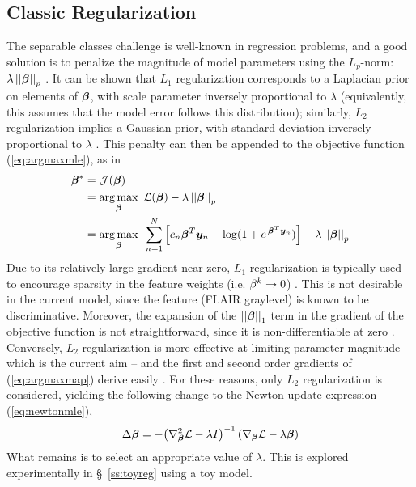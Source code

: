 \subsection{Classic Regularization}
The separable classes challenge is well-known in regression problems, and a good solution is to penalize the magnitude of model parameters using the $L_p$-norm: $\lambda\left|\left|\bm{\beta}\right|\right|_p$ \cite{Zou2005}. It can be shown that $L_1$ regularization corresponds to a Laplacian prior on elements of $\bm{\beta}$, with scale parameter inversely proportional to $\lambda$ (equivalently, this assumes that the model error follows this distribution); similarly, $L_2$ regularization implies a Gaussian prior, with standard deviation inversely proportional to $\lambda$ \cite{Zou2005}. This penalty can then be appended to the objective function (\ref{eq:argmaxmle}), as in 
\begin{align}
\bm{\beta}^* &= \mathcal{J}(\bm{\beta})\nonumber\\
&= \underset{\bm{\beta}}{\arg\max}\enspace\mathcal{L}(\bm{\beta}) - \lambda\left|\left|\bm{\beta}\right|\right|_p \nonumber\\
&= \underset{\bm{\beta}}{\arg\max}\enspace\sum_{n=1}^{N} \Big[ c_n \bm{\beta}^T\bm{y}_n - \log (1+e^{\thinspace\bm{\beta}^T\bm{y}_n}) \Big] - \lambda\left|\left|\bm{\beta}\right|\right|_p
\label{eq:argmaxmap}
\end{align}
Due to its relatively large gradient near zero, $L_1$ regularization is typically used to encourage sparsity in the feature weights (i.e. $\beta^k\rightarrow0$) \cite{Tibshirani1996}. This is not desirable in the current model, since the feature (FLAIR graylevel) is known to be discriminative. Moreover, the expansion of the $\left|\left|\bm{\beta}\right|\right|_1$ term in the gradient of the objective function is not straightforward, since it is non-differentiable at zero \cite{Tibshirani1996,Lee2006}. Conversely, $L_2$ regularization is more effective at limiting parameter magnitude -- which is the current aim -- and the first and second order gradients of (\ref{eq:argmaxmap}) derive easily \cite{Minka2003}. For these reasons, only $L_2$ regularization is considered, yielding the following change to the Newton update expression (\ref{eq:newtonmle}),
\begin{equation}
\Delta\bm{\beta} = -{\left(\nabla^2_{\bm{\beta}}\mathcal{L}-\lambda I\right)}^{-1}\left(\nabla_{\bm{\beta}}\mathcal{L}-\lambda\bm{\beta}\right)
\label{eq:newtonmap}
\end{equation}
What remains is to select an appropriate value of $\lambda$. This is explored experimentally in \S\ \ref{ss:toyreg} using a toy model.
